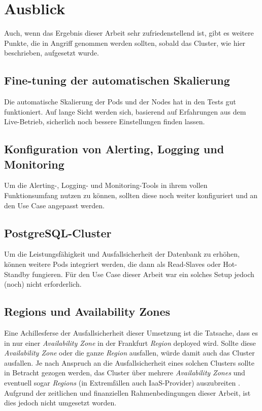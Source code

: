 \section{Ausblick}

Auch, wenn das Ergebnis dieser Arbeit sehr zufriedenstellend ist, gibt es
weitere Punkte, die in Angriff genommen werden sollten, sobald das Cluster, wie
hier beschrieben, aufgesetzt wurde.

\subsection{Fine-tuning der automatischen Skalierung}

Die automatische Skalierung der Pods und der Nodes hat in den Tests gut funktioniert.
Auf lange Sicht werden sich, basierend auf Erfahrungen aus dem Live-Betrieb,
sicherlich noch bessere Einstellungen finden lassen.

\subsection{Konfiguration von Alerting, Logging und Monitoring}

Um die Alerting-, Logging- und Monitoring-Tools in ihrem vollen
Funktionsumfang nutzen zu k\"onnen, sollten diese noch weiter konfiguriert
und an den Use Case angepasst werden.

\subsection{PostgreSQL-Cluster}

Um die Leistungsf\"ahigkeit und Ausfallsicherheit der Datenbank zu
erh\"ohen, k\"onnen weitere Pods integriert werden, die dann als
Read-Slaves oder Hot-Standby fungieren. F\"ur den Use Case dieser
Arbeit war ein solches Setup jedoch (noch) nicht erforderlich.

\subsection{Regions und Availability Zones}

Eine Achillesferse der Ausfallsicherheit dieser Umsetzung ist die Tatsache,
dass es in nur einer \emph{Availability Zone} in der Frankfurt \emph{Region} deployed
wird. Sollte diese \emph{Availability Zone} oder die ganze \emph{Region}
ausfallen, w\"urde damit auch
das Cluster ausfallen.
Je nach Anspruch an die Ausfallsicherheit eines solchen Clusters sollte in Betracht
gezogen werden, das Cluster \"uber mehrere \emph{Availability Zones}
und eventuell sogar \emph{Regions} (in Extremf\"allen auch IaaS-Provider) auszubreiten
\cite{arch4scale}.
Aufgrund der zeitlichen und finanziellen Rahmenbedingungen
dieser Arbeit, ist dies jedoch nicht umgesetzt worden.
